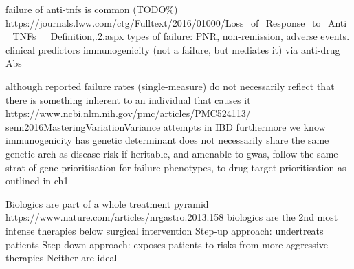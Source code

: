 \begin{outline}
\1 failure of anti-tnfs is common (TODO\%) \url{https://journals.lww.com/ctg/Fulltext/2016/01000/Loss_of_Response_to_Anti_TNFs__Definition,.2.aspx}
    \2 types of failure: \gls{PNR}, non-remission, adverse events.
        \3 clinical predictors \autocite{kennedy2019PredictorsAntiTNFTreatment}
        \3 immunogenicity (not a failure, but mediates it) via anti-drug Abs

\1 although reported failure rates (single-measure) do not necessarily reflect that there is something inherent to an individual that causes it \url{https://www.ncbi.nlm.nih.gov/pmc/articles/PMC524113/} senn2016MasteringVariationVariance
    \2 attempts in IBD \autocite{gaujoux2019CellcentredMetaanalysisReveals}
    \2 furthermore we know immunogenicity has genetic determinant \autocite{sazonovs2019HLADQA105Carriage}
    \2 does not necessarily share the same genetic arch as disease risk
    \2 if heritable, and amenable to gwas, follow the same strat of gene prioritisation for failure phenotypes, to drug target prioritisation as outlined in ch1

\1 Biologics are part of a whole treatment pyramid \url{https://www.nature.com/articles/nrgastro.2013.158}
    \2 biologics are the 2nd most intense therapies below surgical intervention
    \2 Step-up approach: undertreats patients
    \2 Step-down approach: exposes patients to risks from more aggressive therapies
    \2 Neither are ideal


\end{outline}
